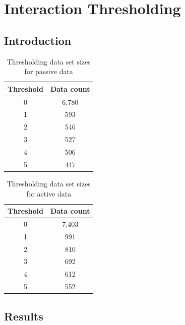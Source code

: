 
\chapter{Interaction Thresholding}
\label{cha:interactionThresholding}

\section{Introduction}
\label{sec:ITintro}


\begin{table}[h]
	\centering
	\begin{tabular}{|c|c|} %
		\hline
		\textbf{Threshold} & \textbf{Data count} \\ \hline
		0 & 6,780 \\ \hline
		1 & 593 \\ \hline
		2 & 546 \\ \hline
		3 & 527 \\ \hline
		4 & 506 \\ \hline
		5 & 447 \\ \hline
	\end{tabular}
	\caption{Thresholding data set sizes for passive data}
	\label{tab:revpol}
\end{table}

\begin{table}[h]
	\centering
	\begin{tabular}{|c|c|} %
		\hline
		\textbf{Threshold} & \textbf{Data count} \\ \hline
		0 & 7,403 \\ \hline
		1 & 991 \\ \hline
		2 & 810 \\ \hline
		3 & 692 \\ \hline
		4 & 612 \\ \hline
		5 & 552 \\ \hline
	\end{tabular}
	\caption{Thresholding data set sizes for active data}
	\label{tab:revpol}
\end{table}

\section{Results}
\label{sec:ITresults}





